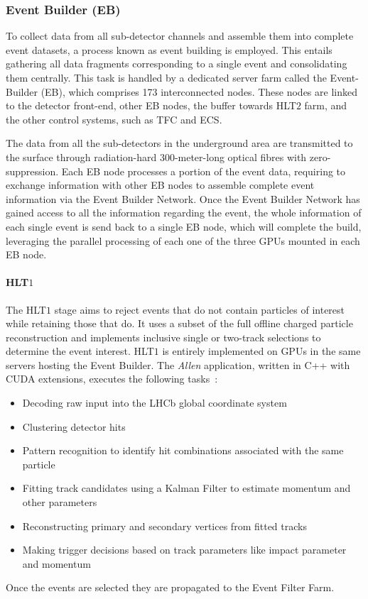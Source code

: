 \subsubsection{Event Builder (EB)}
To collect data from all sub-detector channels and assemble them into complete event datasets, a process known as event building is employed. This entails gathering all data fragments corresponding to a single event and consolidating them centrally. This task is handled by a dedicated server farm called the Event-Builder (EB), which comprises 173 interconnected nodes. These nodes are linked to the detector front-end, other EB nodes, the buffer towards HLT$2$ farm, and the other control systems, such as TFC and ECS.

The data from all the sub-detectors in the underground area are transmitted to the surface through radiation-hard 300-meter-long optical fibres with zero-suppression. Each EB node processes a portion of the event data, requiring to exchange information with other EB nodes to assemble complete event information via the Event Builder Network. Once the Event Builder Network has gained access to all the information regarding the event, the whole information of each single event is send back to a single EB node, which will complete the build, leveraging the parallel processing of each one of the three GPUs mounted in each EB node. 
\paragraph{HLT$1$}
The HLT$1$ stage aims to reject events that do not contain particles of interest while retaining those that do. It uses a subset of the full offline charged particle reconstruction and implements inclusive single or two-track selections to determine the event interest. HLT$1$ is entirely implemented on GPUs in the same servers hosting the Event Builder. The \textit{Allen} application, written in C++ with CUDA extensions, executes the following tasks~\cite{CERN-LHCC-2020-006}:
\begin{itemize}
\item Decoding raw input into the LHCb global coordinate system
\item Clustering detector hits
\item Pattern recognition to identify hit combinations associated with the same particle
\item Fitting track candidates using a Kalman Filter to estimate momentum and other parameters
\item Reconstructing primary and secondary vertices from fitted tracks
\item Making trigger decisions based on track parameters like impact parameter and momentum
\end{itemize}Once the events are selected they are propagated to the Event Filter Farm. 
